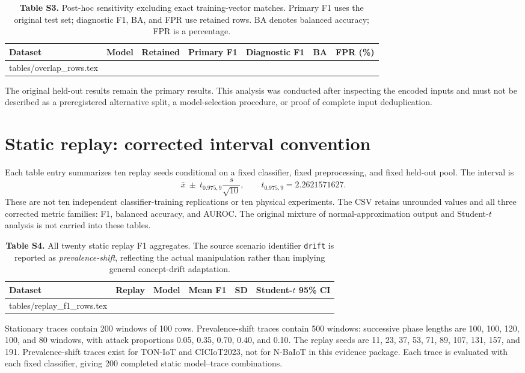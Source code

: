 \documentclass[10pt,a4paper]{article}
\makeatletter
\newcommand{\tableinput}[1]{\@@input #1.tex }
\makeatother
\begin{document}
\begin{table}[h!]
\centering\small
\caption*{\textbf{Table S3.} Post-hoc sensitivity excluding exact training-vector matches. Primary F1 uses the original test set; diagnostic F1, BA, and FPR use retained rows. BA denotes balanced accuracy; FPR is a percentage.}
\setlength{\tabcolsep}{3.4pt}
\begin{tabular}{llrrrrr}\toprule
Dataset & Model & Retained & Primary F1 & Diagnostic F1 & BA & FPR (\%)\\\midrule
\tableinput{tables/overlap_rows}
\bottomrule\end{tabular}
\end{table}
The original held-out results remain the primary results. This analysis was conducted after inspecting the encoded inputs and must not be described as a preregistered alternative split, a model-selection procedure, or proof of complete input deduplication.

\clearpage
\section{Static replay: corrected interval convention}
Each table entry summarizes ten replay seeds conditional on a fixed classifier, fixed preprocessing, and fixed held-out pool. The interval is
\[
\bar{x}\ \pm\ t_{0.975,9}\frac{s}{\sqrt{10}},\qquad t_{0.975,9}=2.2621571627.
\]
These are not ten independent classifier-training replications or ten physical experiments. The CSV retains unrounded values and all three corrected metric families: F1, balanced accuracy, and AUROC. The original mixture of normal-approximation output and Student-$t$ analysis is not carried into these tables.

\begin{table}[h!]
\centering\small
\caption*{\textbf{Table S4.} All twenty static replay F1 aggregates. The source scenario identifier \texttt{drift} is reported as \emph{prevalence-shift}, reflecting the actual manipulation rather than implying general concept-drift adaptation.}
\begin{tabular}{lllrrl}\toprule
Dataset & Replay & Model & Mean F1 & SD & Student-$t$ 95\% CI\\\midrule
\tableinput{tables/replay_f1_rows}
\bottomrule\end{tabular}
\end{table}
Stationary traces contain 200 windows of 100 rows. Prevalence-shift traces contain 500 windows: successive phase lengths are 100, 100, 120, 100, and 80 windows, with attack proportions 0.05, 0.35, 0.70, 0.40, and 0.10. The replay seeds are 11, 23, 37, 53, 71, 89, 107, 131, 157, and 191. Prevalence-shift traces exist for TON-IoT and CICIoT2023, not for N-BaIoT in this evidence package. Each trace is evaluated with each fixed classifier, giving 200 completed static model--trace combinations.
\end{document}
